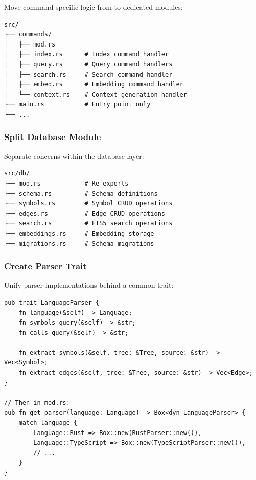 Move command-specific logic from  to dedicated modules:

\begin{verbatim}
src/
├── commands/
│   ├── mod.rs
│   ├── index.rs      # Index command handler
│   ├── query.rs      # Query command handlers
│   ├── search.rs     # Search command handler
│   ├── embed.rs      # Embedding command handler
│   └── context.rs    # Context generation handler
├── main.rs           # Entry point only
└── ...
\end{verbatim}

\subsubsection{Split Database Module}

Separate concerns within the database layer:

\begin{verbatim}
src/db/
├── mod.rs            # Re-exports
├── schema.rs         # Schema definitions
├── symbols.rs        # Symbol CRUD operations
├── edges.rs          # Edge CRUD operations
├── search.rs         # FTS5 search operations
├── embeddings.rs     # Embedding storage
└── migrations.rs     # Schema migrations
\end{verbatim}

\subsubsection{Create Parser Trait}

Unify parser implementations behind a common trait:

\begin{lstlisting}[style=rustcode, caption={Proposed parser trait}]
pub trait LanguageParser {
    fn language(&self) -> Language;
    fn symbols_query(&self) -> &str;
    fn calls_query(&self) -> &str;
    
    fn extract_symbols(&self, tree: &Tree, source: &str) -> Vec<Symbol>;
    fn extract_edges(&self, tree: &Tree, source: &str) -> Vec<Edge>;
}

// Then in mod.rs:
pub fn get_parser(language: Language) -> Box<dyn LanguageParser> {
    match language {
        Language::Rust => Box::new(RustParser::new()),
        Language::TypeScript => Box::new(TypeScriptParser::new()),
        // ...
    }
}
\end{lstlisting}
